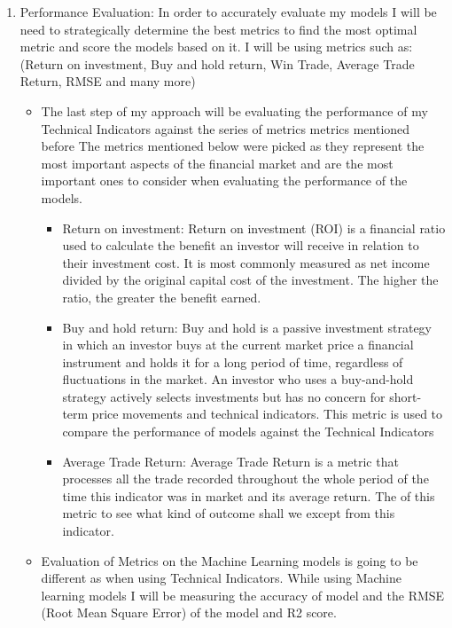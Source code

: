 \documentclass{imc-inf}
\begin{document}
\begin{enumerate}
\begin{itemize}
		\end{itemize}
		\item Performance Evaluation: In order to accurately evaluate my models I will be need to strategically determine the best
		metrics to find the most optimal metric and score the models based on it. I will be using metrics such as:
		(Return on investment, Buy and hold return, Win Trade, Average Trade Return, RMSE and many more)
		\begin{itemize}
			\item  The last step of my approach will be evaluating the performance of my Technical Indicators against the series of metrics 
			metrics mentioned before
			The metrics mentioned below were picked as they represent the most important aspects of the financial market and are the most important
			ones to consider when evaluating the performance of the models.
			\begin{itemize}
				\item Return on investment: Return on investment (ROI) is a financial ratio used to calculate the benefit an investor will receive in relation to their investment cost.
				It is most commonly measured as net income divided by the original capital cost of the investment. The higher the ratio, the greater the benefit earned.
				\item Buy and hold return: Buy and hold is a passive investment strategy in which an investor buys at the current market price a financial 
				instrument and holds it for a long period of time, regardless of fluctuations in the market. An investor who uses a
				buy-and-hold strategy actively selects investments but has no concern for short-term price movements and 
				technical indicators. This metric is used to compare the performance of models against the Technical Indicators
				\item Average Trade Return: Average Trade Return is a metric that processes all the trade recorded throughout the whole period of the time this indicator was in market and its average return. The of this metric to see what kind of outcome shall we except from this indicator.
			\end{itemize}
			\item Evaluation of Metrics on the Machine Learning models is going to be different \cite{evaluation_metrics} as when using Technical Indicators. 
			While using Machine learning models I will be measuring the accuracy of model and the RMSE (Root Mean Square Error) of the model and R2 score.
			\begin{itemize}

\end{itemize}
\end{itemize}
\end{enumerate}
\end{document}

